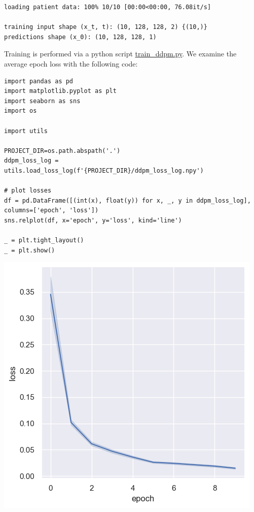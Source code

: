 \documentclass[a4paper, 11pt]{article}
\begin{document}
\begin{verbatim}
loading patient data: 100% 10/10 [00:00<00:00, 76.08it/s]

training input shape (x_t, t): (10, 128, 128, 2) {(10,)}
predictions shape (x_0): (10, 128, 128, 1)
\end{verbatim}

Training is performed via a python script \url{train\_ddpm.py}. We examine the average epoch loss with the following code:
\begin{verbatim}
import pandas as pd
import matplotlib.pyplot as plt
import seaborn as sns
import os

import utils

PROJECT_DIR=os.path.abspath('.')
ddpm_loss_log = utils.load_loss_log(f'{PROJECT_DIR}/ddpm_loss_log.npy')

# plot losses
df = pd.DataFrame([(int(x), float(y)) for x, _, y in ddpm_loss_log], columns=['epoch', 'loss'])
sns.relplot(df, x='epoch', y='loss', kind='line')

_ = plt.tight_layout()
_ = plt.show()
\end{verbatim}

\begin{center}
\includegraphics[width=.9\linewidth]{./.ob-jupyter/98b946f3ee6dbe5becc443cc009687eff61363d4.png}
\end{center}
\end{document}
